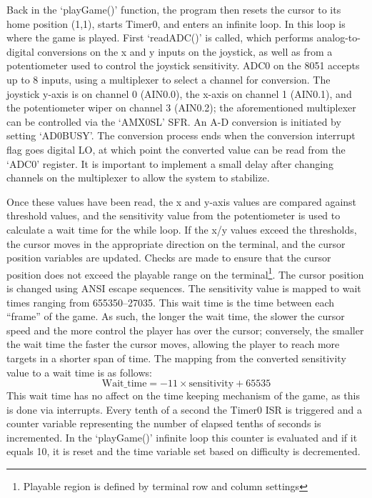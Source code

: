\documentclass[12pt]{article}
\begin{document}
Back in the `playGame()' function, the program then resets the cursor to its home position (1,1), starts Timer0, and enters an infinite loop. In this loop is where the game is played. First `readADC()' is called, which performs analog-to-digital conversions on the x and y inputs on the joystick, as well as from a potentiometer used to control the joystick sensitivity. ADC0 on the 8051 accepts up to 8 inputs, using a multiplexer to select a channel for conversion. The joystick y-axis is on channel 0 (AIN0.0), the x-axis on channel 1 (AIN0.1), and the potentiometer wiper on channel 3 (AIN0.2); the aforementioned multiplexer can be controlled via the `AMX0SL' SFR. An A-D conversion is initiated by setting `AD0BUSY'. The conversion process ends when the conversion interrupt flag goes digital LO, at which point the converted value can be read from the `ADC0' register. It is important to implement a small delay after changing channels on the multiplexer to allow the system to stabilize. 

Once these values have been read, the x and y-axis values are compared against threshold values, and the sensitivity value from the potentiometer is used to calculate a wait time for the while loop. If the x/y values exceed the thresholds, the cursor moves in the appropriate direction on the terminal, and the cursor position variables are updated. Checks are made to ensure that the cursor position does not exceed the playable range on the terminal\footnote{Playable region is defined by terminal row and column settings}. The cursor position is changed using ANSI escape sequences. The sensitivity value is mapped to wait times ranging from 655350--27035. This wait time is the time between each ``frame'' of the game. As such, the longer the wait time, the slower the cursor speed and the more control the player has over the cursor; conversely, the smaller the wait time the faster the cursor moves, allowing the player to reach more targets in a shorter span of time. The mapping from the converted sensitivity value to a wait time is as follows: 
\begin{displaymath}
	\mathrm{Wait\_time}=-11\times \mathrm{sensitivity}+65535
\end{displaymath}
This wait time has no affect on the time keeping mechanism of the game, as this is done via interrupts. Every tenth of a second the Timer0 ISR is triggered and a counter variable representing the number of elapsed tenths of seconds is incremented. In the `playGame()' infinite loop this counter is evaluated and if it equals 10, it is reset and the time variable set based on difficulty is decremented. 
\end{document}
